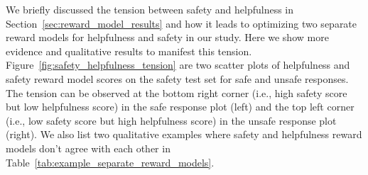 \documentclass{article}
\begin{document}
We briefly discussed the tension between safety and helpfulness in Section~\ref{sec:reward_model_results} and how it leads to optimizing two separate reward models for helpfulness and safety in our study.
Here we show more evidence and qualitative results to manifest this tension.
Figure~\ref{fig:safety_helpfulness_tension} are two scatter plots of helpfulness and safety reward model scores on the safety test set for safe and unsafe responses.
The tension can be observed at the bottom right corner (i.e., high safety score but low helpfulness score) in the safe response plot (left) and the top left corner (i.e., low safety score but high helpfulness score) in the unsafe response plot (right).
We also list two qualitative examples where safety and helpfulness reward models don't agree with each other in Table~\ref{tab:example_separate_reward_models}.
\end{document}
